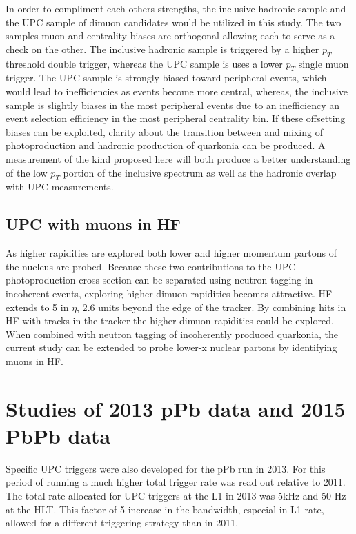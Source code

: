       In order to compliment each others strengths, the inclusive hadronic sample 
        and the UPC sample of dimuon candidates would be utilized in this study.
      The two samples muon and centrality biases are orthogonal allowing each to 
        serve as a check on the other. 
      The inclusive hadronic sample is triggered by a higher $p_{T}$ threshold 
        double trigger, whereas the UPC sample is uses a lower $p_{T}$ single 
        muon trigger.
      The UPC sample is strongly biased toward peripheral events, which would 
        lead to inefficiencies as events become more central, whereas, the 
        inclusive sample is slightly biases in the most peripheral events due to
        an inefficiency an event selection efficiency in the most peripheral 
        centrality bin.
      If these offsetting biases can be exploited, clarity about the transition 
        between and mixing of photoproduction and hadronic production of 
        quarkonia can be produced. 
      A measurement of the kind proposed here will both produce a better 
        understanding of the low $p_{T}$ portion of the inclusive spectrum as 
        well as the hadronic overlap with UPC measurements.

    \subsection{UPC with muons in HF}
      As higher rapidities are explored both lower and higher momentum partons
        of the nucleus are probed. 
      Because these two contributions to the UPC photoproduction cross section 
        can be separated using neutron tagging in incoherent events, exploring
        higher dimuon rapidities becomes attractive.
      HF extends to 5 in $\eta$, 2.6 units beyond the edge of the tracker.
      By combining hits in HF with tracks in the tracker the higher dimuon 
        rapidities could be explored. 
      When combined with neutron tagging of incoherently produced quarkonia,
        the current study can be extended to probe lower-x nuclear partons 
        by identifying muons in HF. 

  \section{Studies of 2013 pPb data and 2015 PbPb data}
    Specific UPC triggers were also developed for the pPb run in 2013. 
    For this period of running a much higher total trigger rate was read out 
      relative to 2011.
    The total rate allocated for UPC triggers at the L1 in 2013 was 5kHz and 
      50 Hz at the HLT.
    This factor of 5 increase in the bandwidth, especial in L1 rate, allowed for
      a different triggering strategy than in 2011. 

